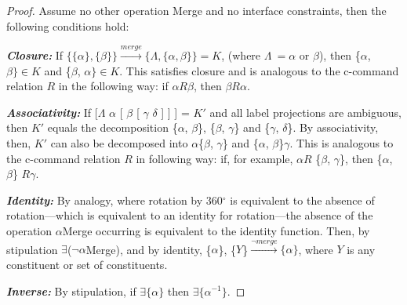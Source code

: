 \documentclass[11pt,twoside]{article}
\begin{document}
\begin{proof}
Assume no other operation Merge and no interface constraints, then the following conditions hold:

\textsl{\textbf{Closure:}} If $\{\{\alpha\}, \{\beta\}\} \stackrel{merge}{\longrightarrow} \{\Lambda, \{\alpha, \beta\}\} = K$, (where $\Lambda\ = \alpha$ or $\beta$), then \{$\alpha$, $\beta\} \in K$ and \{$\beta$, $\alpha\} \in K$. This satisfies closure and is analogous to the c-command relation $R$ in the following way: if $\alpha R \beta$, then $\beta R \alpha$.

\textsl{\textbf{Associativity:}} If [$\Lambda$ $\alpha$ [ $\beta$ [ $\gamma$ $\delta$ ] ] ] = $K'$ and all label projections are ambiguous, then $K'$ equals the decomposition \{$\alpha$, $\beta$\}, \{$\beta$, $\gamma$\} and \{$\gamma$, $\delta$\}. By associativity, then, $K'$ can also be decomposed into $\alpha$\{$\beta$, $\gamma$\} and  \{$\alpha$, $\beta$\}$\gamma$. This is analogous to the c-command relation $R$ in following way: if, for example,  $\alpha R$ \{$\beta$, $\gamma$\}, then  \{$\alpha$, $\beta$\} $R \gamma$. 

\textsl{\textbf{Identity:}} By analogy, where rotation by 360$^\circ$ is equivalent to the absence of rotation---which is equivalent to an identity for rotation---the absence of the operation $\alpha$Merge occurring is equivalent to the identity function. Then, by stipulation $\exists$($\neg\alpha$Merge), and by identity, \{$\alpha$\}, \{$Y$\}$\stackrel{\neg merge}{\longrightarrow} \{\alpha\}$, where $Y$ is any constituent or set of constituents.

\textsl{\textbf{Inverse:}} By stipulation, if $\exists \{\alpha\}$ then $\exists \{\alpha^{-1}\}$. 

\end{proof}
\end{document}
